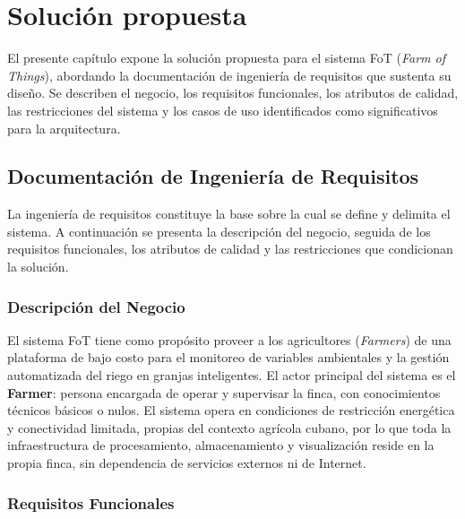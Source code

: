\chapter{Solución propuesta}\label{chap:2}

El presente capítulo expone la solución propuesta para el sistema FoT (\textit{Farm of Things}),
abordando la documentación de ingeniería de requisitos que sustenta su diseño. Se describen
el negocio, los requisitos funcionales, los atributos de calidad, las restricciones del sistema
y los casos de uso identificados como significativos para la arquitectura.

\section{Documentación de Ingeniería de Requisitos}

La ingeniería de requisitos constituye la base sobre la cual se define y delimita el sistema.
A continuación se presenta la descripción del negocio, seguida de los requisitos funcionales,
los atributos de calidad y las restricciones que condicionan la solución.

\subsection{Descripción del Negocio}

El sistema FoT tiene como propósito proveer a los agricultores (\textit{Farmers}) de una
plataforma de bajo costo para el monitoreo de variables ambientales y la gestión automatizada
del riego en granjas inteligentes. El actor principal del sistema es el \textbf{Farmer}: persona
encargada de operar y supervisar la finca, con conocimientos técnicos básicos o nulos. El sistema
opera en condiciones de restricción energética y conectividad limitada, propias del contexto
agrícola cubano, por lo que toda la infraestructura de procesamiento, almacenamiento y
visualización reside en la propia finca, sin dependencia de servicios externos ni de Internet.

\subsection{Requisitos Funcionales}

